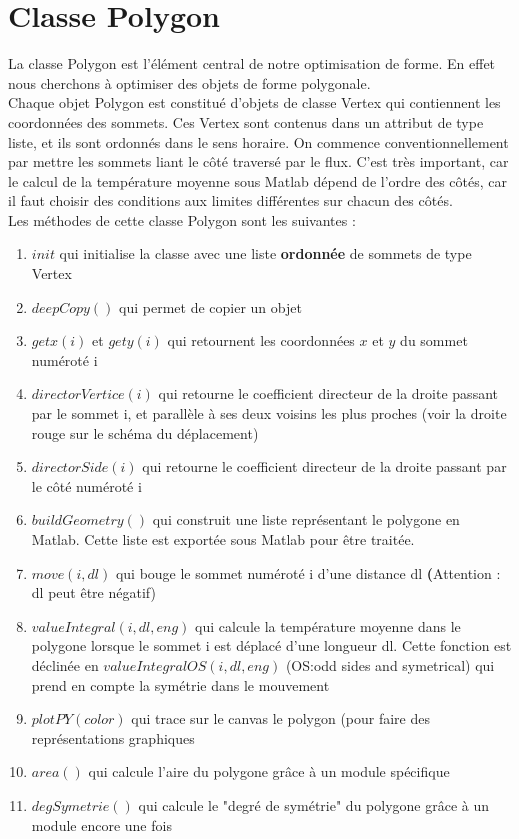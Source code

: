 \documentclass[a4paper,reqno]{article}
\begin{document}

\section*{Classe Polygon}

La classe Polygon est l'élément central de notre optimisation de forme. En effet nous cherchons à optimiser des objets de forme polygonale. \\
Chaque objet Polygon est constitué d'objets de classe Vertex qui contiennent les coordonnées des sommets. Ces Vertex sont contenus dans un attribut de type liste, et ils sont ordonnés dans le sens horaire. On commence conventionnellement par mettre les sommets liant le côté traversé par le flux. C'est très important, car le calcul de la température moyenne sous Matlab dépend de l'ordre des côtés, car il faut choisir des conditions aux limites différentes sur chacun des côtés.\\
Les méthodes de cette classe Polygon sont les suivantes : 
\begin{enumerate}
\item $init$ qui initialise la classe avec une liste \textbf{ordonnée} de sommets de type Vertex
\item $deepCopy()$ qui permet de copier un objet
\item $getx(i)$ et $gety(i)$ qui retournent les coordonnées $x$ et $y$ du sommet numéroté i 
\item $directorVertice(i)$ qui retourne le coefficient directeur de la droite passant par le sommet i, et parallèle à ses deux voisins les plus proches (voir la droite rouge sur le schéma du déplacement)
\item $directorSide(i)$ qui retourne le coefficient directeur de la droite passant par le côté numéroté i 
\item $buildGeometry()$ qui construit une liste représentant le polygone en Matlab. Cette liste est exportée sous Matlab pour être traitée. 
\item $move(i, dl)$ qui bouge le sommet numéroté i d'une distance dl \textbf(Attention : dl peut être négatif)
\item $valueIntegral(i, dl, eng)$ qui calcule la température moyenne dans le polygone lorsque le sommet i est déplacé d'une longueur dl. Cette fonction est déclinée en $valueIntegralOS(i, dl, eng)$ (OS:odd sides and symetrical) qui prend en compte la symétrie dans le mouvement
\item $plotPY(color)$ qui trace sur le canvas le polygon (pour faire des représentations graphiques
\item $area()$ qui calcule l'aire du polygone grâce à un module spécifique
\item $degSymetrie()$ qui calcule le "degré de symétrie" du polygone grâce à un module encore une fois 
\
\end{enumerate}
\newpage
\end{document}
